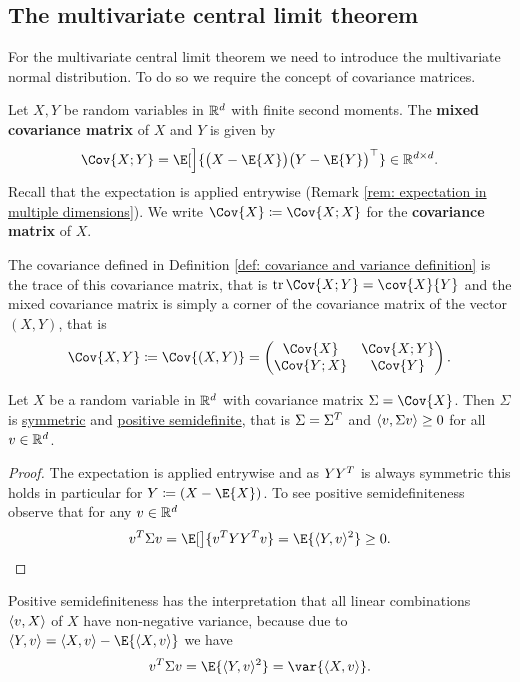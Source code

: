 \subsection{The multivariate central limit theorem}

For the multivariate central limit theorem we need to introduce the multivariate
normal distribution. To do so we require the concept of covariance matrices.

\begin{definition}
    Let \(X, Y\) be random variables in \(\mathbb{R}^d\) with finite second moments.
    The \textbf{mixed covariance matrix} of \(X\) and \(Y\) is given by
    \[
        \Cov{X;Y}
        = \E[\Big]{\bigl(X - \E{X}\bigr)\bigl(Y - \E{Y}\bigr)^\top}
        \in \real^{\dims \times \dims}.
    \]
    Recall that the expectation is applied entrywise (Remark \ref{rem: expectation in multiple dimensions}).
    We write \(\Cov{X} \coloneq \Cov{X;X}\) for the \textbf{covariance matrix} of \(X\).
\end{definition}
\begin{remark}
    The covariance defined in Definition \ref{def: covariance and variance
    definition} is the trace of this covariance matrix, that is \(\tr\Cov{X;Y} =
    \cov{X}{Y}\) and the mixed covariance matrix is simply a corner of the
    covariance matrix of the vector \((X,Y)\), that is
    \[
        \Cov{X,Y} \coloneq \Cov{(X,Y)} = \begin{pmatrix}
            \Cov{X} & \Cov{X;Y} \\
            \Cov{Y;X} & \Cov{Y}
        \end{pmatrix}.
    \]
\end{remark}

\begin{lemma}
    \label{lem: covariance matrix psd}
    Let \(X\) be a random variable in \(\mathbb{R}^d\) with covariance matrix
    \(\Sigma = \Cov{X}\). Then \(\Sigma\) is \underline{symmetric} and
    \underline{positive semidefinite}, that is \(\Sigma = \Sigma^T\)
    and \(\langle v, \Sigma v\rangle \ge 0\) for all \(v\in \mathbb{R}^d\).
\end{lemma}
\begin{proof}
    The expectation is applied entrywise and as \(Y Y^T\) is always
    symmetric this holds in particular for \(Y\coloneq (X - \E{X})\).
    To see positive semidefiniteness observe that for any \(v\in \mathbb{R}^d\)
    \[
        v^\transpose \Sigma v = \E[\big]{v^\transpose Y Y^\transpose v}
        = \E{\scp{Y, v}^2} \ge 0.
        \qedhere
    \]
\end{proof}
\begin{remark}
    Positive semidefiniteness has the interpretation that all linear
    combinations \(\langle v, X\rangle\) of \(X\) have non-negative variance, because
    due to \(\scp{Y, v} = \scp{X, v} - \E{\scp{X,v}}\) we have
    \[
        v^\transpose \Sigma v
        = \E{\scp{Y, v}^2}
        = \var{\scp{X, v}}.
    \]
\end{remark}


